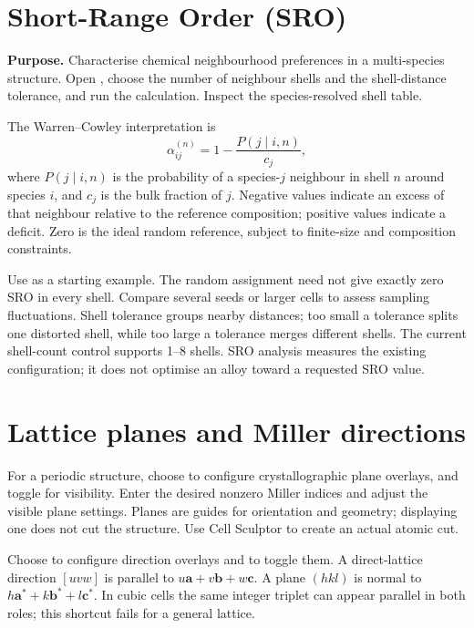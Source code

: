 \section{Short-Range Order (SRO)}
\textbf{Purpose.} Characterise chemical neighbourhood preferences in a multi-species structure. Open , choose the number of neighbour shells and the shell-distance tolerance, and run the calculation. Inspect the species-resolved shell table.

The Warren--Cowley interpretation is
\[
\alpha_{ij}^{(n)}=1-\frac{P(j\mid i,n)}{c_j},
\]
where $P(j\mid i,n)$ is the probability of a species-$j$ neighbour in shell $n$ around species $i$, and $c_j$ is the bulk fraction of $j$. Negative values indicate an excess of that neighbour relative to the reference composition; positive values indicate a deficit. Zero is the ideal random reference, subject to finite-size and composition constraints.

Use  as a starting example. The random assignment need not give exactly zero SRO in every shell. Compare several seeds or larger cells to assess sampling fluctuations. Shell tolerance groups nearby distances; too small a tolerance splits one distorted shell, while too large a tolerance merges different shells. The current shell-count control supports 1--8 shells. SRO analysis measures the existing configuration; it does not optimise an alloy toward a requested SRO value.

\section{Lattice planes and Miller directions}
For a periodic structure, choose  to configure crystallographic plane overlays, and toggle  for visibility. Enter the desired nonzero Miller indices and adjust the visible plane settings. Planes are guides for orientation and geometry; displaying one does not cut the structure. Use Cell Sculptor to create an actual atomic cut.

Choose  to configure direction overlays and  to toggle them. A direct-lattice direction $[uvw]$ is parallel to $u\mathbf a+v\mathbf b+w\mathbf c$. A plane $(hkl)$ is normal to $h\mathbf a^*+k\mathbf b^*+l\mathbf c^*$. In cubic cells the same integer triplet can appear parallel in both roles; this shortcut fails for a general lattice.

